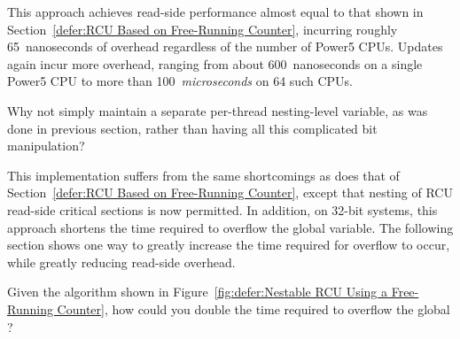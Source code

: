 This approach achieves read-side performance almost equal to that
shown in
Section~\ref{defer:RCU Based on Free-Running Counter}, incurring
roughly 65~nanoseconds of overhead regardless of the number of
Power5 CPUs.
Updates again incur more overhead, ranging from about 600~nanoseconds on
a single Power5 CPU to more than 100~\emph{microseconds} on 64
such CPUs.

\QuickQuiz{}
	Why not simply maintain a separate per-thread nesting-level
	variable, as was done in previous section, rather than having
	all this complicated bit manipulation?
 \QuickQuizEnd

This implementation suffers from the same shortcomings as does that of
Section~\ref{defer:RCU Based on Free-Running Counter}, except that
nesting of RCU read-side critical sections is now permitted.
In addition, on 32-bit systems, this approach shortens the time
required to overflow the global  variable.
The following section shows one way to greatly increase the time
required for overflow to occur, while greatly reducing read-side
overhead.

\QuickQuiz{}
	Given the algorithm shown in
	Figure~\ref{fig:defer:Nestable RCU Using a Free-Running Counter},
	how could you double the time required to overflow the global
	?
 \QuickQuizEnd

